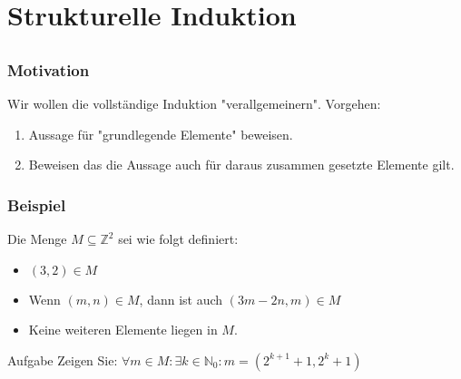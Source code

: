 \section{Strukturelle Induktion}

\subsection*{}
\begin{frame}
  \frametitle{Motivation}
  Wir wollen die vollständige Induktion "verallgemeinern".
  Vorgehen:
  \begin{enumerate}
    \item Aussage für "grundlegende Elemente" beweisen.
    \item Beweisen das die Aussage auch für daraus zusammen gesetzte Elemente gilt.
  \end{enumerate}
\end{frame}
\begin{frame}
  \frametitle{Beispiel}
  Die Menge $M \subseteq \mathbb{Z}^2$ sei wie folgt definiert:
  \begin{itemize}
    \item $(3, 2) \in M$
    \item Wenn $(m, n) \in M$, dann ist auch $(3m - 2n, m) \in M$
    \item Keine weiteren Elemente liegen in $M$.
  \end{itemize}
  \begin{exampleblock}{Aufgabe}
    Zeigen Sie: $\forall m \in M: \exists k \in \mathbb{N}_0: m = (2^{k+1}+1, 2^k + 1)$
  \end{exampleblock}
\end{frame}
